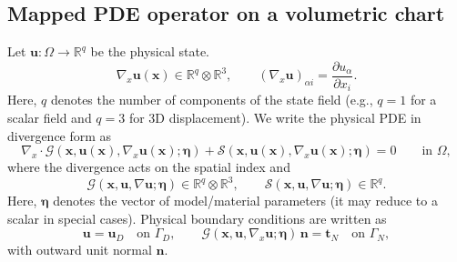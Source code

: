 \documentclass[sort&compress]{svjour3} %
\newcommand{\tensor}[1]{\ensuremath{\boldsymbol{#1}}}
\begin{document}
\subsection{Mapped PDE operator on a volumetric chart}
\label{sec:mapped_operator}
Let $\tensor u:\Omega\rightarrow\mathbb{R}^{q}$ be the physical state.
\[
\nabla_x \tensor u(\tensor x)\in \mathbb{R}^{q}\otimes\mathbb{R}^{3},
\qquad
(\nabla_x \tensor u)_{\alpha i}=\frac{\partial u_\alpha}{\partial x_i}.
\]
Here, $q$ denotes the number of components of the state field (e.g., $q=1$ for a scalar field and $q=3$ for 3D displacement).
We write the physical PDE in divergence form as
\begin{equation}
\nabla_x\cdot \mathcal{G}\!\left(\tensor x,\tensor u(\tensor x),\nabla_x \tensor u(\tensor x);\tensor\eta\right)
+ \mathcal{S}\!\left(\tensor x,\tensor u(\tensor x),\nabla_x \tensor u(\tensor x);\tensor\eta\right)=0
\qquad \text{in }\Omega,
\label{eq:abstract_pde}
\end{equation}
where the divergence acts on the spatial index and
\[
\mathcal{G}(\tensor x,\tensor u,\nabla \tensor u;\tensor\eta)\in \mathbb{R}^{q}\otimes\mathbb{R}^{3},
\qquad
\mathcal{S}(\tensor x,\tensor u,\nabla \tensor u;\tensor\eta)\in \mathbb{R}^{q}.
\]
Here, $\tensor\eta$ denotes the vector of model/material parameters (it may reduce to a scalar in special cases).
Physical boundary conditions are written as
\begin{equation}
\tensor u=\tensor u_D \quad \text{on }\Gamma_D,
\qquad
\mathcal{G}(\tensor x,\tensor u,\nabla_x \tensor u;\tensor\eta)\,\mathbf{n} = \mathbf{t}_N
\quad \text{on }\Gamma_N,
\label{eq:abstract_bc}
\end{equation}
with outward unit normal $\mathbf{n}$.
\end{document}
